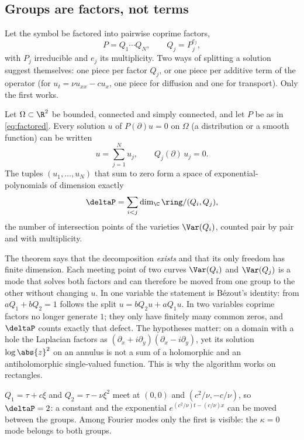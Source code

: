 \subsection{Groups are factors, not terms}\label{sec:factor}
Let the symbol be factored into pairwise coprime factors,
\begin{equation}\label{eq:factored}
  P=Q_1\cdots Q_N,\qquad Q_j=P_j^{e_j},
\end{equation}
with $P_j$ irreducible and $e_j$ its multiplicity. Two ways of splitting a solution suggest themselves: one piece per
factor $Q_j$, or one piece per additive term of the operator (for $u_t=\nu u_{xx}-cu_x$, one piece for diffusion and one
for transport). Only the first works.

\begin{theorem}\label{thm:factor}
Let $\Omega\subset\R^2$ be bounded, connected and simply connected, and let $P$ be as in \eqref{eq:factored}. Every
solution $u$ of $P(\partial)u=0$ on $\Omega$ (a distribution or a smooth function) can be written
\begin{equation}\label{eq:split}
  u=\sum_{j=1}^Nu_j,\qquad Q_j(\partial)\,u_j=0 .
\end{equation}
The tuples $(u_1,\dots,u_N)$ that sum to zero form a space of exponential-polynomials of dimension exactly
\begin{equation}\label{eq:delta}
  \deltaP=\sum_{i<j}\dim_\C\ring/(Q_i,Q_j),
\end{equation}
the number of intersection points of the varieties $\Var(Q_i)$, counted pair by pair and with multiplicity.
\end{theorem}

The theorem says that the decomposition \emph{exists} and that its only freedom has finite dimension. Each meeting point
of two curves $\Var(Q_i)$ and $\Var(Q_j)$ is a mode that solves both factors and can therefore be moved from one group to
the other without changing $u$. In one variable the statement is B\'ezout's identity: from $aQ_1+bQ_2=1$
follows the split $u=bQ_2u+aQ_1u$. In two variables coprime factors no longer generate $1$; they only have finitely many common
zeros, and $\deltaP$ counts exactly that defect. The hypotheses matter: on a domain with a hole the Laplacian factors as
$(\partial_x+i\partial_y)(\partial_x-i\partial_y)$, yet its solution $\log\abs{z}^2$ on an annulus is not a sum of a
holomorphic and an antiholomorphic single-valued function. This is why the algorithm works on rectangles.

\begin{example}\label{ex:delta}
$Q_1=\tau+c\xi$ and $Q_2=\tau-\nu\xi^2$ meet at $(0,0)$ and $(c^2/\nu,-c/\nu)$, so $\deltaP=2$: a constant and the
exponential $e^{(c^2/\nu)t-(c/\nu)x}$ can be moved between the groups. Among Fourier modes only the first is visible:
the $\kappa=0$ mode belongs to both groups.
\end{example}

